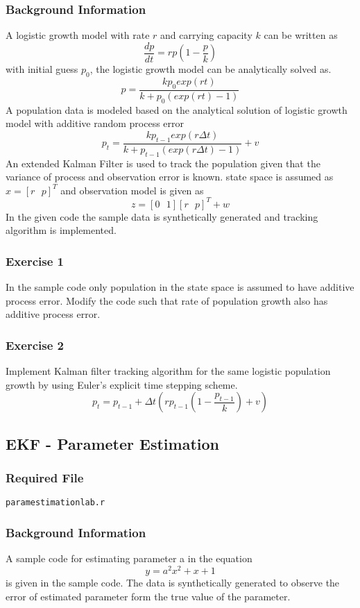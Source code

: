 \documentclass{article}
\begin{document}
\subsubsection*{Background Information}
A logistic growth model with rate $r$ and carrying capacity $k$ can be written as
$$\frac{dp}{dt}=rp\left( 1-\frac{p}{k}\right)$$
with initial guess $p_0$, the logistic growth model can be analytically solved as.
$$p=\frac{kp_0exp(rt)}{k+p_0(exp(rt)-1)}$$
A population data is modeled based on the analytical solution of logistic growth model with additive random process error
$$p_{t}=\frac{kp_{t-1}exp(r \Delta t)}{k+p_{t-1}(exp(r \Delta t)-1)} + v$$
An extended Kalman Filter is used to track the population given that the variance of process and observation error is known. state space is assumed as $x=[r \text{  }  p]^T$ and observation model is given as
$$z=[0\text{  }  1][r\text{  }  p]^T+w$$
In the given code the sample data is  synthetically generated and tracking algorithm is implemented.

\subsubsection*{Exercise 1}
In the sample code only population in the state space is assumed to have additive process error. Modify the code such that rate of population growth also has additive process error. 
\subsubsection*{Exercise 2}
Implement Kalman filter tracking algorithm for the same logistic population growth by using Euler's explicit time stepping scheme.
$$p_t=p_{t-1}+\Delta t \left( rp_{t-1}\left( 1-\frac{p_{t-1}}{k}\right)+ v\right )$$

\subsection{EKF - Parameter Estimation}
\subsubsection*{Required File}
\verb|paramestimationlab.r|
\subsubsection*{Background Information}
A sample code for estimating parameter a in the equation $$y=a^2x^2+x+1$$ is given in the sample code.  The data is synthetically generated to observe the error of estimated parameter form the true value of the parameter.
\end{document}
